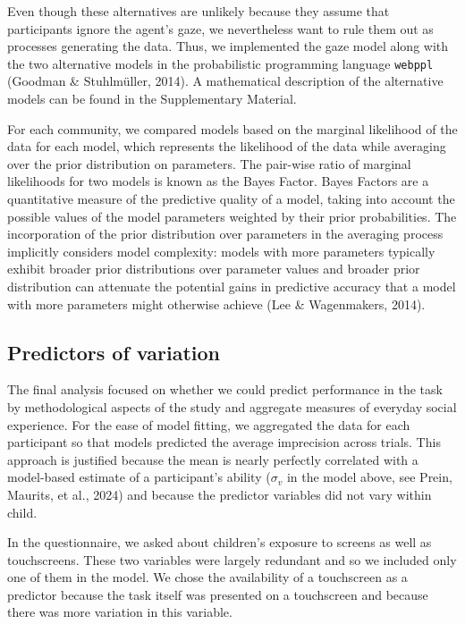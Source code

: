 \documentclass[
  man,floatsintext]{apa7}
\begin{document}
Even though these alternatives are unlikely because they assume that participants ignore the agent's gaze, we nevertheless want to rule them out as processes generating the data. Thus, we implemented the gaze model along with the two alternative models in the probabilistic programming language \texttt{webppl} (Goodman \& Stuhlmüller, 2014). A mathematical description of the alternative models can be found in the Supplementary Material.

For each community, we compared models based on the marginal likelihood of the data for each model, which represents the likelihood of the data while averaging over the prior distribution on parameters. The pair-wise ratio of marginal likelihoods for two models is known as the Bayes Factor. Bayes Factors are a quantitative measure of the predictive quality of a model, taking into account the possible values of the model parameters weighted by their prior probabilities. The incorporation of the prior distribution over parameters in the averaging process implicitly considers model complexity: models with more parameters typically exhibit broader prior distributions over parameter values and broader prior distribution can attenuate the potential gains in predictive accuracy that a model with more parameters might otherwise achieve (Lee \& Wagenmakers, 2014).

\hypertarget{predictors-of-variation}{%
\subsection{Predictors of variation}\label{predictors-of-variation}}

The final analysis focused on whether we could predict performance in the task by methodological aspects of the study and aggregate measures of everyday social experience. For the ease of model fitting, we aggregated the data for each participant so that models predicted the average imprecision across trials. This approach is justified because the mean is nearly perfectly correlated with a model-based estimate of a participant's ability (\(\sigma_v\) in the model above, see Prein, Maurits, et al., 2024) and because the predictor variables did not vary within child.

In the questionnaire, we asked about children's exposure to screens as well as touchscreens. These two variables were largely redundant and so we included only one of them in the model. We chose the availability of a touchscreen as a predictor because the task itself was presented on a touchscreen and because there was more variation in this variable.
\end{document}
